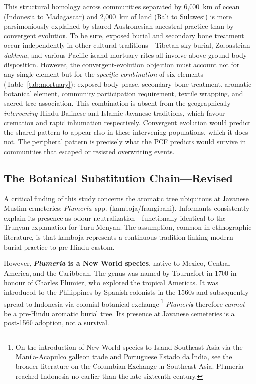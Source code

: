 \documentclass[12pt,a4paper]{article}
\begin{document}
This structural homology across communities separated by 6,000~km of ocean (Indonesia to Madagascar) and 2,000~km of land (Bali to Sulawesi) is more parsimoniously explained by shared Austronesian ancestral practice than by convergent evolution. To be sure, exposed burial and secondary bone treatment occur independently in other cultural traditions---Tibetan sky burial, Zoroastrian \emph{dakhma}, and various Pacific island mortuary rites all involve above-ground body disposition. However, the convergent-evolution objection must account not for any single element but for the \emph{specific combination} of six elements (Table~\ref{tab:mortuary}): exposed body phase, secondary bone treatment, aromatic botanical element, community participation requirement, textile wrapping, and sacred tree association. This combination is absent from the geographically \emph{intervening} Hindu-Balinese and Islamic Javanese traditions, which favour cremation and rapid inhumation respectively. Convergent evolution would predict the shared pattern to appear also in these intervening populations, which it does not. The peripheral pattern is precisely what the PCF predicts would survive in communities that escaped or resisted overwriting events.

\subsection{The Botanical Substitution Chain---Revised}
\label{sec:botanical}

A critical finding of this study concerns the aromatic tree ubiquitous at Javanese Muslim cemeteries: \emph{Plumeria}~spp. (kamboja/frangipani). Informants consistently explain its presence as odour-neutralization---functionally identical to the Trunyan explanation for Taru Menyan. The assumption, common in ethnographic literature, is that kamboja represents a continuous tradition linking modern burial practice to pre-Hindu custom.

However, \textbf{\emph{Plumeria} is a New World species}, native to Mexico, Central America, and the Caribbean. The genus was named by Tournefort in 1700 in honour of Charles Plumier, who explored the tropical Americas. It was introduced to the Philippines by Spanish colonists in the 1560s and subsequently spread to Indonesia via colonial botanical exchange.\footnote{On the introduction of New World species to Island Southeast Asia via the Manila-Acapulco galleon trade and Portuguese Estado da \'{I}ndia, see the broader literature on the Columbian Exchange in Southeast Asia. Plumeria reached Indonesia no earlier than the late sixteenth century.} \emph{Plumeria} therefore \emph{cannot} be a pre-Hindu aromatic burial tree. Its presence at Javanese cemeteries is a post-1560 adoption, not a survival.
\end{document}
